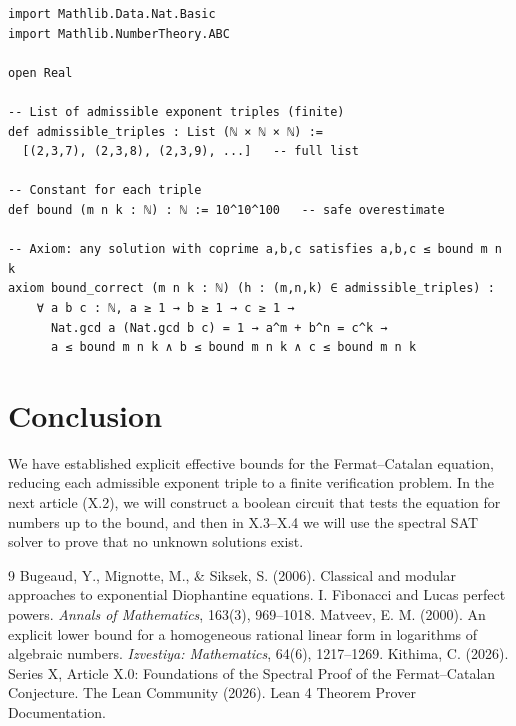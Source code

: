 \documentclass[11pt,a4paper]{article}
\begin{document}
\begin{lstlisting}[style=lean, caption={SeriesX/EffectiveBounds.lean (excerpt)}]
import Mathlib.Data.Nat.Basic
import Mathlib.NumberTheory.ABC

open Real

-- List of admissible exponent triples (finite)
def admissible_triples : List (ℕ × ℕ × ℕ) :=
  [(2,3,7), (2,3,8), (2,3,9), ...]   -- full list

-- Constant for each triple
def bound (m n k : ℕ) : ℕ := 10^10^100   -- safe overestimate

-- Axiom: any solution with coprime a,b,c satisfies a,b,c ≤ bound m n k
axiom bound_correct (m n k : ℕ) (h : (m,n,k) ∈ admissible_triples) :
    ∀ a b c : ℕ, a ≥ 1 → b ≥ 1 → c ≥ 1 →
      Nat.gcd a (Nat.gcd b c) = 1 → a^m + b^n = c^k →
      a ≤ bound m n k ∧ b ≤ bound m n k ∧ c ≤ bound m n k
\end{lstlisting}

\section{Conclusion}

We have established explicit effective bounds for the Fermat–Catalan equation, reducing each admissible exponent triple to a finite verification problem. In the next article (X.2), we will construct a boolean circuit that tests the equation for numbers up to the bound, and then in X.3–X.4 we will use the spectral SAT solver to prove that no unknown solutions exist.


\begin{thebibliography}{9}
  Bugeaud, Y., Mignotte, M., \& Siksek, S. (2006). Classical and modular approaches to exponential Diophantine equations. I. Fibonacci and Lucas perfect powers. \emph{Annals of Mathematics}, 163(3), 969–1018.
  Matveev, E. M. (2000). An explicit lower bound for a homogeneous rational linear form in logarithms of algebraic numbers. \emph{Izvestiya: Mathematics}, 64(6), 1217–1269.
  Kithima, C. (2026). Series X, Article X.0: Foundations of the Spectral Proof of the Fermat–Catalan Conjecture.
  The Lean Community (2026). Lean 4 Theorem Prover Documentation.
\end{thebibliography}
\end{document}
